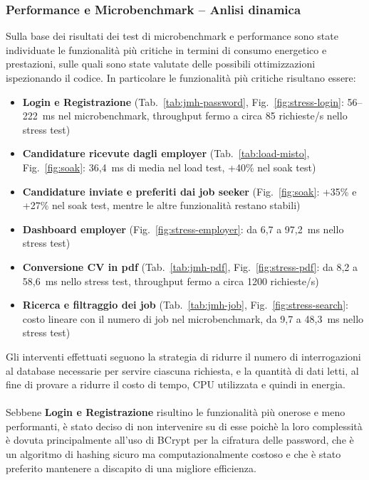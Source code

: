 \documentclass[12pt,a4paper]{article}
\begin{document}
    \subsubsection{Performance e Microbenchmark -- Anlisi dinamica}
    Sulla base dei risultati dei test di microbenchmark e performance sono state individuate le
    funzionalità più critiche in termini di consumo energetico e prestazioni, sulle quali sono state
    valutate delle possibili ottimizzazioni ispezionando il codice. In particolare le funzionalità più
    critiche risultano essere:
    \begin{itemize}
        \item \textbf{Login e Registrazione} (Tab.~\ref{tab:jmh-password}, Fig.~\ref{fig:stress-login}:
        56--222~ms nel microbenchmark, throughput fermo a circa 85 richieste/s nello stress test)
        \item \textbf{Candidature ricevute dagli employer} (Tab.~\ref{tab:load-misto}, Fig.~\ref{fig:soak}:
        36,4~ms di media nel load test, +40\% nel soak test)
        \item \textbf{Candidature inviate e preferiti dai job seeker} (Fig.~\ref{fig:soak}:
        +35\% e +27\% nel soak test, mentre le altre funzionalità restano stabili)
        \item \textbf{Dashboard employer} (Fig.~\ref{fig:stress-employer}:
        da 6,7 a 97,2~ms nello stress test)
        \item \textbf{Conversione CV in pdf} (Tab.~\ref{tab:jmh-pdf}, Fig.~\ref{fig:stress-pdf}:
        da 8,2 a 58,6~ms nello stress test, throughput fermo a circa 1200 richieste/s)
        \item \textbf{Ricerca e filtraggio dei job} (Tab.~\ref{tab:jmh-job}, Fig.~\ref{fig:stress-search}:
        costo lineare con il numero di job nel microbenchmark, da 9,7 a 48,3~ms nello stress test)
    \end{itemize}
    Gli interventi effettuati seguono la strategia di ridurre il numero di interrogazioni al database
    necessarie per servire ciascuna richiesta, e la quantità di dati letti, al fine di provare a ridurre il costo
    di tempo, CPU utilizzata e quindi in energia.
    \paragraph{}
    Sebbene \textbf{Login e Registrazione} risultino le funzionalità più onerose e meno performanti, è stato
    deciso di non intervenire su di esse poichè la loro complessità è dovuta principalmente all'uso di BCrypt
    per la cifratura delle password, che è un algoritmo di hashing sicuro ma computazionalmente costoso e che
    è stato preferito mantenere a discapito di una migliore efficienza.
\end{document}
